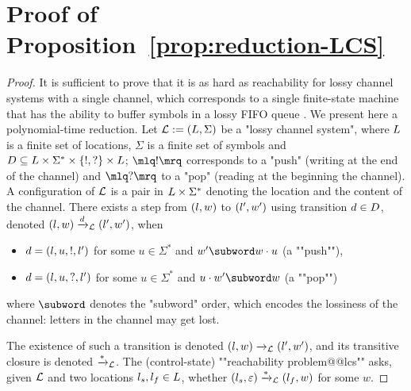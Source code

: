 \section{Proof of Proposition~\ref{prop:reduction-LCS}}
\label{app:reduction-lcs}

\propReductionLCS*
{}
\begin{proof}
	It is sufficient to prove that it is as hard as reachability for lossy channel systems with a single channel, which corresponds to a single finite-state machine that has the ability to buffer symbols in a lossy FIFO queue \cite{Schnoebelen2002verifying}. We present here a polynomial-time reduction.
	Let $\mathcal{L} := (L,\Sigma)$ be a "lossy channel system", where $L$ is a finite set of locations, $\Sigma$ is a finite set of symbols and $D \subseteq L \times \Sigma^* \times \{!, ?\} \times L$; $\quotemarks{!}$ corresponds to a "push" (writing at the end of the channel) and $\quotemarks{?}$ to a "pop" (reading at the beginning the channel). A configuration of $\mathcal{L}$ is a pair in $L \times \Sigma^*$ denoting the location and the content of the channel. There exists a step from $(l,w)$ to $(l',w')$ using transition $d \in D$, denoted $(l,w) \xrightarrow{d}_{\mathcal{L}} (l',w')$, when
	\begin{itemize}
		\item $d = (l,u,!,l')$ for some $u \in \Sigma^*$ and $w' \subword w \cdot u$ (a ""push""),
		\item $d = (l,u,?,l')$ for some $u \in \Sigma^*$ and $u \cdot w' \subword w$ (a ""pop"")
	\end{itemize}
	where $\subword$ denotes the "subword" order, which encodes the lossiness of the channel: letters in the channel may get lost. 
	
	The existence of such a transition is denoted $(l,w) \xrightarrow{}_{\mathcal{L}} (l',w')$, and its transitive closure is denoted $\xrightarrow{*}_{\mathcal{L}}$. The (control-state) ""reachability problem@@lcs"" asks, given $\mathcal{L}$ and two locations $l_s, l_f \in L$, whether $(l_s,\varepsilon) \xrightarrow{*}_{\mathcal{L}} (l_f, w)$ for some $w$. 
	

\end{proof}
